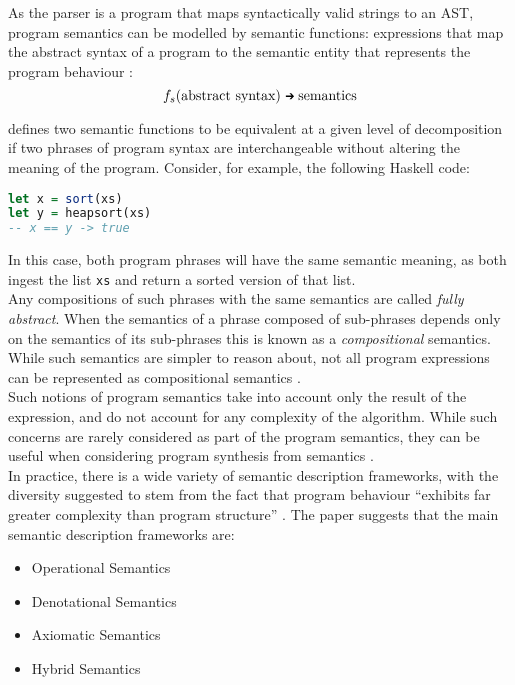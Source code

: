 \documentclass[a4paper,11pt]{report}
\newcommand{\goesto}[0]{\MVRightarrow}
\newcommand{\mathgoesto}[0]{\mathord{\text{ \goesto\;}}}
\begin{document}
As the parser is a program that maps syntactically valid strings to an AST, program semantics can be modelled by semantic functions: expressions that map the abstract syntax of a program to the semantic entity that represents the program behaviour \citep{mosses1992action}:
\begin{equation*}
    f_s(\text{abstract syntax}) \mathgoesto \text{semantics}
\end{equation*}

\citet{mosses1992action} defines two semantic functions to be equivalent at a given level of decomposition if two phrases of program syntax are interchangeable without altering the meaning of the program. 
Consider, for example, the following Haskell code:
\begin{lstlisting}[language=haskell]
let x = sort(xs)
let y = heapsort(xs)
-- x == y -> true
\end{lstlisting}
In this case, both program phrases will have the same semantic meaning, as both ingest the list \lstinline[language=haskell]{xs} and return a sorted version of that list.\\

Any compositions of such phrases with the same semantics are called \textit{fully abstract}. 
When the semantics of a phrase composed of sub-phrases depends only on the semantics of its sub-phrases this is known as a \textit{compositional} semantics. 
While such semantics are simpler to reason about, not all program expressions can be represented as compositional semantics \citep{mosses1992action}.\\

Such notions of program semantics take into account only the result of the expression, and do not account for any complexity of the algorithm.
While such concerns are rarely considered as part of the program semantics, they can be useful when considering program synthesis from semantics \citep{kanovich1991efficient}.\\

In practice, there is a wide variety of semantic description frameworks, with the diversity suggested to stem from the fact that program behaviour ``exhibits far greater complexity than program structure'' \citep[pg. 14]{Zhang:2004:SSD:981009.981013}.
The paper suggests that the main semantic description frameworks are:
\begin{itemize}
    \item Operational Semantics
    \item Denotational Semantics
    \item Axiomatic Semantics
    \item Hybrid Semantics
\end{itemize}
\end{document}
